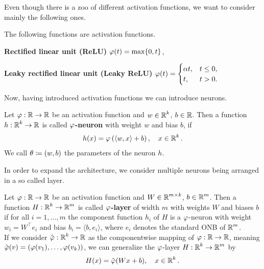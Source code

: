 Even though there is a zoo of different activation functions, we want to consider mainly the following ones.

\begin{example}
The following functions are activation functions.
\begin{mydescription}{}
\item[\textbf{Rectified linear unit (ReLU)}] $\operatorname{\varphi}(t) = \max\{0, t\}$,
\item[\textbf{Leaky rectified linear unit (Leaky ReLU)}] $\displaystyle \operatorname{\varphi}(t) = \begin{cases}
\alpha t, 	& t \leq 0,\\
t,		& t > 0.
\end{cases}$
\end{mydescription}
\end{example}

Now, having introduced activation functions we can introduce neurons.

\begin{definition}
Let $\operatorname{\varphi}: \operatorname{\mathbb{R}} \to \operatorname{\mathbb{R}}$ be an activation function and $w\in \operatorname{\mathbb{R}}^k$, $b \in \operatorname{\mathbb{R}}$. Then a function $h: \operatorname{\mathbb{R}}^k \to \operatorname{\mathbb{R}}$ is called \textbf{$\operatorname{\varphi}$-neuron} with weight $w$ and bias $b$, if
\begin{align}\label{def_neuron}
h(x) = \operatorname{\varphi} \left(\langle w, x \rangle + b \right), \quad x \in \operatorname{\mathbb{R}}^k.
\end{align}
We call $\operatorname{\theta} \coloneqq (w, b)$ the parameters of the neuron $h$.
\end{definition}

In order to expand the architecture, we consider multiple neurons being arranged in a so called layer.

\begin{definition}
Let $\operatorname{\varphi}: \operatorname{\mathbb{R}} \to \operatorname{\mathbb{R}}$ be an activation function and $W \in \operatorname{\mathbb{R}}^{m\times k}$, $b\in \operatorname{\mathbb{R}}^m$. Then a function $H:\operatorname{\mathbb{R}}^k \to \operatorname{\mathbb{R}}^m$ is called \textbf{$\operatorname{\varphi}$-layer} of width $m$ with weights $W$ and biases $b$ if for all $i=1,\ldots,m$ the component function $h_i$ of $H$ is a $\operatorname{\varphi}$-neuron with weight $w_i = W^\top e_i$ and bias $b_i = \langle b, e_i \rangle$, where $e_i$ denotes the standard ONB of $\operatorname{\mathbb{R}}^m$.\\
If we consider $\hat{\operatorname{\varphi}}: \operatorname{\mathbb{R}}^k \to \operatorname{\mathbb{R}}$ as the componentwise mapping of $\operatorname{\varphi}:\operatorname{\mathbb{R}}\to \operatorname{\mathbb{R}}$, meaning $\hat{\operatorname{\varphi}}(v) = (\operatorname{\varphi}(v_1), \ldots, \operatorname{\varphi}(v_k))$, we can generalize the $\operatorname{\varphi}$-layer $H:\operatorname{\mathbb{R}}^k \to \operatorname{\mathbb{R}}^m$ by
\begin{align}
H(x) = \hat{\operatorname{\varphi}}(Wx + b), \quad x \in \operatorname{\mathbb{R}} ^k.
\end{align}
\end{definition}

